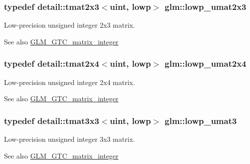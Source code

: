 \subsubsection[{\texorpdfstring{lowp\+\_\+umat2x3}{lowp_umat2x3}}]{\setlength{\rightskip}{0pt plus 5cm}typedef detail\+::tmat2x3$<$uint, lowp$>$ {\bf glm\+::lowp\+\_\+umat2x3}}\hypertarget{group__gtc__matrix__integer_ga4c8388c4a03f228c0e12dd7b7445115d}{}\label{group__gtc__matrix__integer_ga4c8388c4a03f228c0e12dd7b7445115d}
Low-\/precision unsigned integer 2x3 matrix. \begin{DoxySeeAlso}{See also}
\hyperlink{group__gtc__matrix__integer}{G\+L\+M\+\_\+\+G\+T\+C\+\_\+matrix\+\_\+integer} 
\end{DoxySeeAlso}
\subsubsection[{\texorpdfstring{lowp\+\_\+umat2x4}{lowp_umat2x4}}]{\setlength{\rightskip}{0pt plus 5cm}typedef detail\+::tmat2x4$<$uint, lowp$>$ {\bf glm\+::lowp\+\_\+umat2x4}}\hypertarget{group__gtc__matrix__integer_ga581eef861234e918e88377fd331e37e6}{}\label{group__gtc__matrix__integer_ga581eef861234e918e88377fd331e37e6}
Low-\/precision unsigned integer 2x4 matrix. \begin{DoxySeeAlso}{See also}
\hyperlink{group__gtc__matrix__integer}{G\+L\+M\+\_\+\+G\+T\+C\+\_\+matrix\+\_\+integer} 
\end{DoxySeeAlso}
\subsubsection[{\texorpdfstring{lowp\+\_\+umat3}{lowp_umat3}}]{\setlength{\rightskip}{0pt plus 5cm}typedef detail\+::tmat3x3$<$uint, lowp$>$ {\bf glm\+::lowp\+\_\+umat3}}\hypertarget{group__gtc__matrix__integer_ga7160c0ac500826224d3baf1003c0432c}{}\label{group__gtc__matrix__integer_ga7160c0ac500826224d3baf1003c0432c}
Low-\/precision unsigned integer 3x3 matrix. \begin{DoxySeeAlso}{See also}
\hyperlink{group__gtc__matrix__integer}{G\+L\+M\+\_\+\+G\+T\+C\+\_\+matrix\+\_\+integer} 
\end{DoxySeeAlso}
